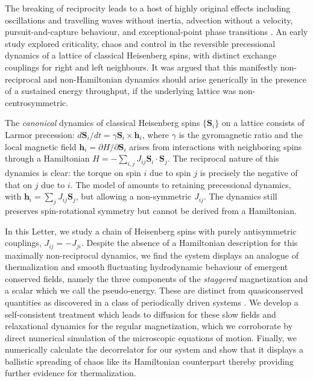 \documentclass[prl,aps,twocolumn,nosuperscriptaddress,bibnotes,notitlepage,nofootinbib]{revtex4-2}
\newcommand{\spin}{\mathbf{S}}
\begin{document}
The breaking of reciprocity leads to a host of highly original effects including oscillations and travelling waves without inertia, advection without a velocity, pursuit-and-capture behaviour, and exceptional-point phase transitions 
\cite{ PhysRevLett.106.054102, PhysRevLett.117.248001, PhysRevE.99.012612, PhysRevLett.122.185301, PhysRevResearch.2.033018, Galda2019}. 
An early study \cite{das2002driven} explored criticality, chaos and control in the reversible precessional dynamics of a lattice of classical Heisenberg spins, with distinct exchange couplings for right and left neighbours. It was argued \cite{das2002driven} that this manifestly non-reciprocal and non-Hamiltonian dynamics should arise generically in the presence of a sustained energy throughput, if the underlying lattice was non-centrosymmetric. 

The \textit{canonical} dynamics of classical Heisenberg spins \cite{ma1975critical} $\{\spin_i\}$ on a lattice  consists of Larmor precession: $d\spin_i/dt = \gamma \spin_i \times \mathbf{h}_i$, 
where $\gamma$ is the gyromagnetic ratio and the local magnetic field $\mathbf{h}_i = \partial H / \partial \spin_i$ arises from interactions with neighboring spins through a Hamiltonian $H = - \sum_{i,j}J_{ij}\spin_i \cdot \spin_j$. The reciprocal nature of this dynamics is clear: the torque on spin $i$ due to spin $j$ is precisely the negative of that on $j$ due to $i$. The model of \cite{das2002driven} amounts to retaining precessional dynamics, with $\mathbf{h}_i = \sum_j J_{ij} \spin_j$, but allowing a non-symmetric $J_{ij}$. The dynamics still preserves spin-rotational symmetry but cannot be derived from a Hamiltonian. 


In this Letter, we study a chain of Heisenberg spins with purely antisymmetric couplings, $J_{ij} = - J_{ji}$. Despite the absence of a Hamiltonian description for this maximally non-reciprocal dynamics, we find the system displays %
an analogue of thermalization and smooth fluctuating hydrodynamic behaviour of emergent conserved fields, namely the three components of the \textit{staggered} magnetization and a scalar which we call the pseudo-energy. These are distinct from quasiconserved quantities as discovered in a class of periodically driven systems \cite{McRoberts_PRR5}. We develop a self-consistent treatment which leads to diffusion for these slow fields and relaxational dynamics for the regular magnetization, which we corroborate by direct numerical simulation of the microscopic equations of motion. Finally, we numerically calculate the decorrelator for our system and show that it displays a ballistic spreading of chaos like its Hamiltonian counterpart thereby providing further evidence for thermalization.
\end{document}
